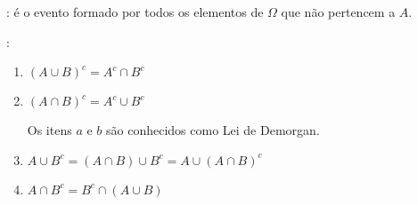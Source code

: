 \documentclass[11pt,a4paper]{book}
\begin{document}
\begin{description}
    \begin{figure}[H]
      \centering
      
      \caption{}
      \label{fig:5}
    \end{figure}
  \item [Evento Complementar ($\bar{A}$ ou $A^c$)]: é o evento formado por todos os elementos de $\Omega$ que não pertencem a $A$.
    \begin{description}
    \begin{figure}[H]
      \centering
      
      \caption{}
      \label{fig:6}
    \end{figure}

\item [Alguns exemplos de eventos complementares]: 

    \begin{enumerate}[align=left,label=({\alph*}) ]

      \item $(A \cup B )^c = A^c \cap B^c$
        \begin{figure}[H]
          \centering
          
          \caption{}
          \label{fig:7}
        \end{figure}

      \item $(A \cap B)^c = A^c \cup B^c $
        \begin{figure}[H]
          \centering
          
          \caption{}
          \label{figura:8}
        \end{figure}

        Os itens $a$ e $b$ são conhecidos como Lei de Demorgan.
      \item $A \cup B^c = ( A \cap B ) \cup B^c = A \cup (A \cap B)^c$
        \begin{figure}[H]
          \centering
          
          \caption{}
          \label{figura:9}

        \end{figure}

      \item  $A \cap B^c = B^c \cap (A \cup B)$
        \begin{figure}[H]
          \centering
          
          \caption{}
          \label{fig:10}
        \end{figure}

    \end{enumerate}


\end{description}
\end{description}
\end{document}
